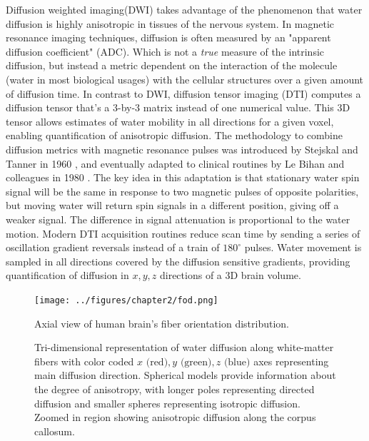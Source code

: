 Diffusion weighted imaging(DWI) takes advantage of the phenomenon that water diffusion is highly anisotropic in tissues of the nervous system. In magnetic resonance imaging techniques, diffusion is often measured by an  "apparent diffusion coefficient" (ADC). Which is not a \emph{true} measure of the intrinsic diffusion, but instead a metric dependent on the interaction of the molecule (water in most biological usages) with the cellular structures over a given amount of diffusion time. In contrast to DWI, diffusion tensor imaging (DTI) computes a diffusion tensor that's a 3-by-3 matrix instead of one numerical value. This 3D tensor allows estimates of water mobility in all directions for a given voxel, enabling quantification of anisotropic diffusion. The methodology to combine diffusion metrics with magnetic resonance pulses was introduced by Stejskal and Tanner in 1960 \cite{stejskal_spin_1965}, and eventually adapted to clinical routines by Le Bihan and colleagues in 1980 \cite{le_bihan_mr_1986}. The key idea in this adaptation is that stationary water spin signal will be the same in response to two magnetic pulses of opposite polarities, but  moving water will return spin signals in a different position, giving off a weaker signal. The difference in signal attenuation is proportional to the water motion. Modern DTI acquisition routines reduce scan time by sending a series of oscillation gradient reversals instead of a train of $180^{\circ}$ pulses. Water movement is sampled in all directions covered by the diffusion sensitive gradients, providing quantification of diffusion in $x,y,z$ directions of a 3D brain volume. 

\begin{figure}[htbp]
	\centering
	\texttt{[image: ../figures/chapter2/fod.png]}
	\caption{Axial view of human brain's fiber orientation distribution.}
	\caption*{Tri-dimensional representation of water diffusion along white-matter fibers with color coded $x \textrm{ (red)},y\textrm{ (green)},z\textrm{ (blue)}$ axes representing main diffusion direction. Spherical models provide information about the degree of anisotropy, with longer poles representing directed diffusion and smaller spheres representing isotropic diffusion. Zoomed in region showing anisotropic diffusion along the corpus callosum.}
	\label{fig:fod}
\end{figure}


